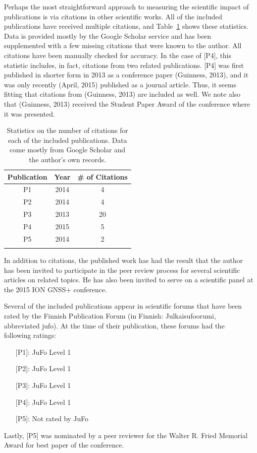 Perhaps the most straightforward approach to measuring the scientific impact of publications is via citations in other scientific works. All of the included publications have received multiple citations, and Table~\ref{table:citations} shows these statistics. Data is provided mostly by the Google Scholar service and has been supplemented with a few missing citations that were known to the author. All citations have been manually checked for accuracy. In the case of [P4], this statistic includes, in fact, citations from two related publications. [P4] was first published in shorter form in 2013 as a conference paper (Guinness, 2013), and it was only recently (April, 2015) published as a journal article. Thus, it seems fitting that citations from (Guinness, 2013) are included as well. We note also that (Guinness, 2013) received the Student Paper Award of the conference where it was presented.
%
\begin{table}
\centering
\begin{tabular}{ccc}
\hline\noalign{\smallskip}
\textbf{Publication} & \textbf{Year} & \textbf{\# of Citations}\\
\hline\noalign{\smallskip}
P1 & 2014 & 4\\
P2 & 2014 & 4\\
P3 & 2013 & 20\\
P4 & 2015 & 5\\
P5 & 2014 & 2\\
\hline\noalign{\smallskip}
\end{tabular}
\caption[Citation statistics for included publications]{Statistics on the number of citations for each of the included publications. Data come mostly from Google Scholar and the author's own records.}\label{table:citations}
\end{table}
%
In addition to citations, the published work has had the result that the author has been invited to participate in the peer review process for several scientific articles on related topics. He has also been invited to serve on a scientific panel at the 2015 ION GNSS+ conference.

Several of the included publications appear in scientific forums that have been rated by the Finnish Publication Forum (in Finnish: Julkaisufoorumi, abbreviated \acrshort{jufo}). At the time of their publication, these forums had the following ratings:

\begin{itemize}
  \setlength\itemsep{0em}
  \item[] [P1]: JuFo Level 1
  \item[] {[P2]}: JuFo Level 1
  \item[] {[P3]}: JuFo Level 1
  \item[] {[P4]}: JuFo Level 1
  \item[] {[P5]}: Not rated by JuFo
\end{itemize}


Lastly, [P5] was nominated by a peer reviewer for the Walter R. Fried Memorial Award for best paper of the conference.



